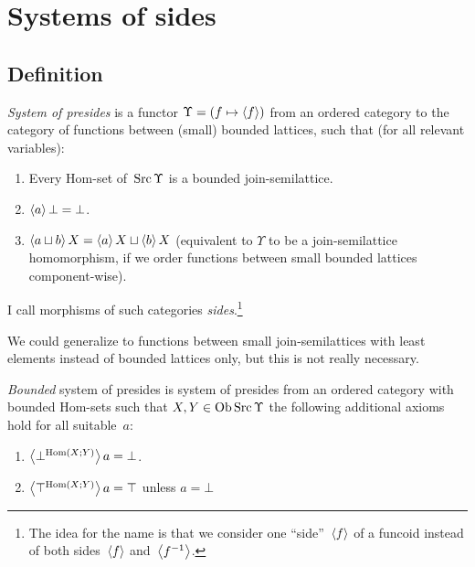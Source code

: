 \chapter{Systems of sides}

\section{Definition}

\begin{defn}
\emph{System of presides} is
a functor $\Upsilon = (f\mapsto\left\langle f\right\rangle)$ from an ordered category
to the category of functions between (small) bounded lattices,
such that (for all relevant variables):
\begin{enumerate}
  \item Every Hom-set of~$\operatorname{Src}\Upsilon$ is a bounded join-semilattice.

  \item $\left\langle a\right\rangle\bot = \bot$.

  \item $\left\langle a \sqcup b\right\rangle X = \left\langle a\right\rangle X \sqcup \left\langle b\right\rangle X$ (equivalent to $\Upsilon$ to be a join-semilattice homomorphism,
    if we order functions between small bounded lattices component-wise).
\end{enumerate}
I call morphisms of such categories \emph{sides}.\footnote{The idea for the name is that we consider one ``side''~$\left\langle f\right\rangle$ of a funcoid instead of both sides~$\left\langle f\right\rangle$ and~$\left\langle f^{-1}\right\rangle$.}
\end{defn}

\begin{rem}
We could generalize to functions between small join-semilattices with least elements instead of bounded lattices only, but this is not really necessary.
\end{rem}

\begin{defn}
\emph{Bounded} system of presides is system of presides from an ordered category with bounded Hom-sets
such that $X,Y\in\operatorname{Ob}\operatorname{Src}\Upsilon$ the following additional axioms hold for all suitable~$a$:
\begin{enumerate}
  \item $\left\langle \bot^{\operatorname{Hom}(X;Y)}\right\rangle a = \bot$.

  \item $\left\langle \top^{\operatorname{Hom}(X;Y)}\right\rangle a = \top$ unless $a = \bot$
\end{enumerate}
\end{defn}

